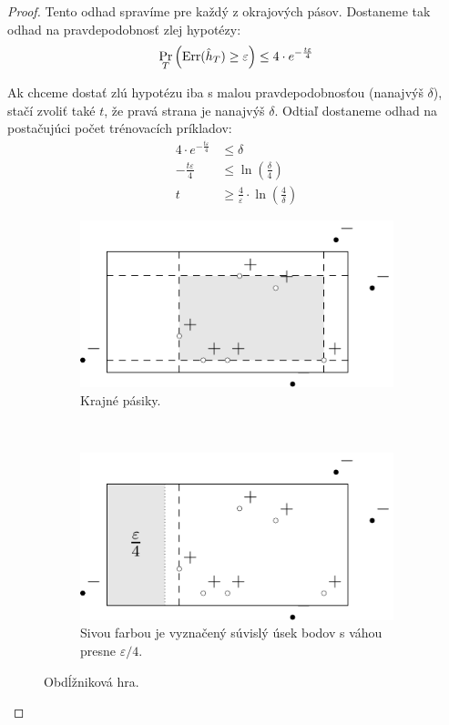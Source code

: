 \begin{proof}
  Tento odhad spravíme pre každý z okrajových pásov. Dostaneme tak
  odhad na pravdepodobnosť zlej hypotézy:
  $$ \operatorname*{\textstyle\mathrm{Pr}}_T \left( \mathrm{Err}(\hat{h}_T) \geq \varepsilon \right) \leq 4 \cdot e^{-\frac{t \varepsilon}{4}} $$

  Ak chceme dostať zlú hypotézu iba s malou pravdepodobnosťou (nanajvýš $\delta$),
  stačí zvoliť také $t$, že pravá strana je nanajvýš $\delta$. Odtiaľ dostaneme
  odhad na postačujúci počet trénovacích príkladov:
  \begin{align}
    4 \cdot e^{-\frac{t \varepsilon}{4}} &\leq \delta \\
    -\frac{t \varepsilon}{4} &\leq \ln \left( \frac{\delta}{4} \right) \\
    t &\geq \frac{4}{\varepsilon} \cdot \ln \left( \frac{4}{\delta} \right)
  \end{align}
  
  \begin{figure}
    \begin{subfigure}[t]{0.49\linewidth}
      \centering
      \includegraphics[scale=1]{obrazky/rectgame2.pdf}
      \caption{Krajné pásiky.}
      \label{rectgame:strips}
    \end{subfigure}
    ~
    \begin{subfigure}[t]{0.49\linewidth}
      \centering
      \includegraphics[scale=1]{obrazky/rectgame3.pdf}
      \caption{Sivou farbou je vyznačený súvislý úsek bodov s váhou
        presne $\varepsilon/4$.}
      \label{rectgame:eps_strip}
    \end{subfigure}
    \caption{Obdĺžniková hra.}
  \end{figure}
\end{proof}




